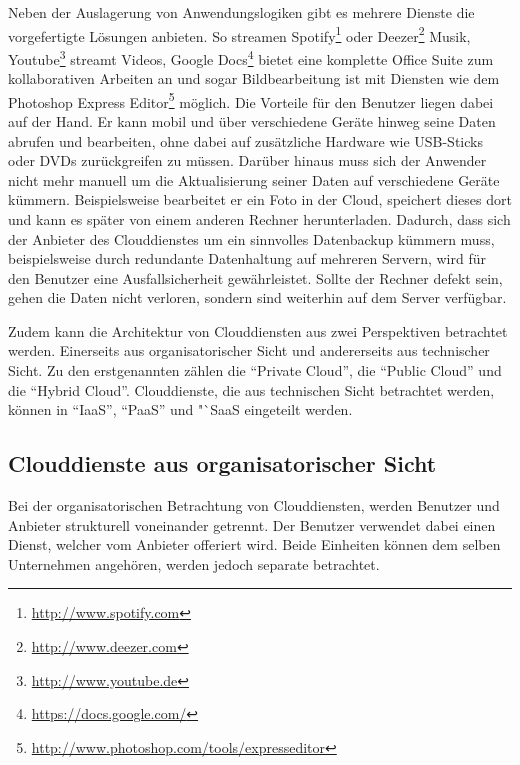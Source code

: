 Neben der Auslagerung von Anwendungslogiken gibt es mehrere Dienste die vorgefertigte Lösungen anbieten.
So streamen Spotify\footnote{\url{http://www.spotify.com}} oder Deezer\footnote{\url{http://www.deezer.com}} Musik, Youtube\footnote{\url{http://www.youtube.de}} streamt Videos, Google Docs\footnote{\url{https://docs.google.com/}} bietet eine komplette Office Suite zum kollaborativen Arbeiten an und sogar Bildbearbeitung ist mit Diensten wie dem Photoshop Express Editor\footnote{\url{http://www.photoshop.com/tools/expresseditor}} möglich.
Die Vorteile für den Benutzer liegen dabei auf der Hand.
Er kann mobil und über verschiedene Geräte hinweg seine Daten abrufen und bearbeiten, ohne dabei auf zusätzliche Hardware wie USB-Sticks oder DVDs zurückgreifen zu müssen.
Darüber hinaus muss sich der Anwender nicht mehr manuell um die Aktualisierung seiner Daten auf verschiedene Geräte kümmern.
Beispielsweise bearbeitet er ein Foto in der Cloud, speichert dieses dort und kann es später von einem anderen Rechner herunterladen.
Dadurch, dass sich der Anbieter des Clouddienstes um ein sinnvolles Datenbackup kümmern muss, beispielsweise durch redundante Datenhaltung auf mehreren Servern, wird für den Benutzer eine Ausfallsicherheit gewährleistet.
Sollte der Rechner defekt sein, gehen die Daten nicht verloren, sondern sind weiterhin auf dem Server verfügbar.

Zudem kann die Architektur von Clouddiensten aus zwei Perspektiven betrachtet werden.
Einerseits aus organisatorischer Sicht und andererseits aus technischer Sicht\cite[vgl.][Seite 25]{baun10}.
Zu den erstgenannten zählen die "`Private Cloud"', die "`Public Cloud"' und die "`Hybrid Cloud"'\cite[vgl.][Seite 25]{baun10}.
Clouddienste, die aus technischen Sicht betrachtet werden, können in "`\ac{IaaS}"', "`\ac{PaaS}"' und "`\ac{SaaS} eingeteilt werden\cite[vgl.][Seite 25]{baun10}.

\subsection{Clouddienste aus organisatorischer Sicht}
Bei der organisatorischen Betrachtung von Clouddiensten, werden Benutzer und Anbieter strukturell voneinander getrennt.
Der Benutzer verwendet dabei einen Dienst, welcher vom Anbieter offeriert wird.
Beide Einheiten können dem selben Unternehmen angehören, werden jedoch separate betrachtet.

